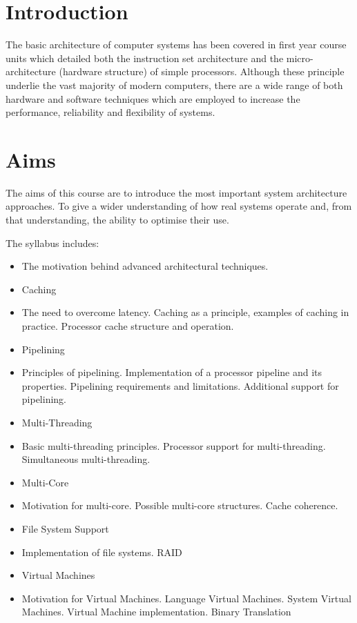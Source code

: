 \section*{Introduction}

The basic architecture of computer systems has been covered in first year course
units which detailed both the instruction set architecture and the micro-
architecture (hardware structure) of simple processors. Although these principle
underlie the vast majority of modern computers, there are a wide range of both
hardware and software techniques which are employed to increase the performance,
reliability and flexibility of systems.

\section*{Aims}

The aims of this course are to introduce the most important system architecture
approaches. To give a wider understanding of how real systems operate and, from
that understanding, the ability to optimise their use.

The syllabus includes:

\begin{itemize}
	\item The motivation behind advanced architectural techniques.
	\item Caching
	\item The need to overcome latency. Caching as a principle, examples of caching in practice. Processor cache structure and operation.
	\item Pipelining
	\item Principles of pipelining. Implementation of a processor pipeline and its properties. Pipelining requirements and limitations. Additional support for pipelining.
	\item Multi-Threading
	\item Basic multi-threading principles. Processor support for multi-threading. Simultaneous multi-threading.
	\item Multi-Core
	\item Motivation for multi-core. Possible multi-core structures. Cache coherence.
	\item File System Support
	\item Implementation of file systems. RAID
	\item Virtual Machines
	\item Motivation for Virtual Machines. Language Virtual Machines. System Virtual Machines. Virtual Machine implementation. Binary Translation
\end{itemize}


